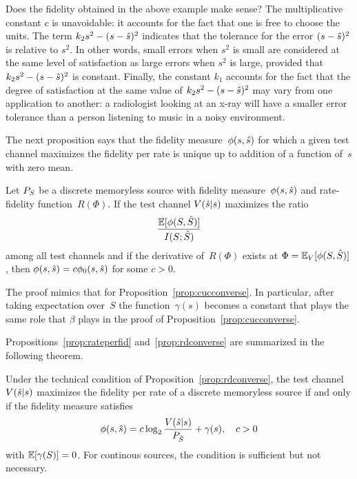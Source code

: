 Does the fidelity obtained in the above example make sense? The multiplicative
constant $c$ is unavoidable: it accounts for the fact that one is free to choose
the units. The term $k_2s^2-(s-{\hat{s}})^2$ indicates that the tolerance for the
error $(s-{\hat{s}})^2$ is relative to $s^2$. In other words, small errors when $s^2$
is small are considered at the same level of satisfaction as large errors when
$s^2$ is large, provided that $k_2s^2-(s-{\hat{s}})^2$ is constant. Finally, the
constant $k_1$ accounts for the fact that the degree of satisfaction at the same
value of $k_2s^2-(s-{\hat{s}})^2$ may vary from one application to another: a
radiologist looking at an x-ray will have a smaller error tolerance than a
person listening to music in a noisy environment.

The next proposition says that the fidelity measure~$\phi(s,{\hat{s}})$ for which a
given test channel maximizes the fidelity per rate is unique up to addition of a
function of~$s$ with zero mean.

\begin{proposition}
  \label{prop:rdconverse}
  Let ${P_S}$ be a discrete memoryless source with fidelity measure~$\phi(s,{\hat{s}})$
  and rate-fidelity function~$R(\Phi)$. If the test channel $V({\hat{s}}|s)$ maximizes
  the ratio
  \[ \frac{\mathbb{E}[\phi(S,{\hat{S}})]}{I(S;{\hat{S}})} \]
  among all test channels and if the derivative of~$R(\Phi)$ exists at $\Phi =
  {\mathbb{E}_V}[\phi(S,{\hat{S}})]$, then $\phi(s,{\hat{s}}) = c {\phi_0}(s,{\hat{s}})$ for some $c > 0$.
\end{proposition}

The proof mimics that for Proposition~\ref{prop:cucconverse}. In particular,
after taking expectation over~$S$ the function~$\gamma(s)$ becomes a constant
that plays the same role that $\beta$ plays in the proof of
Proposition~\ref{prop:cucconverse}.

Propositions~\ref{prop:rateperfid} and~\ref{prop:rdconverse} are summarized in
the following theorem.
\begin{theorem}
  \label{thm:rdthm}
  Under the technical condition of Proposition~\ref{prop:rdconverse}, the
  test channel~$V({\hat{s}}|s)$ maximizes the fidelity per rate of a
  discrete memoryless source if and only if the fidelity measure satisfies
  \begin{equation}
    \label{eq:optfid}
    \phi(s,{\hat{s}}) = c \log_2\frac{V({\hat{s}}|s)}{{P_{\hat{S}}}} + \gamma(s), \quad c > 0
  \end{equation}
  with $\mathbb{E}[\gamma(S)] = 0$.  For continous sources, the condition is sufficient
  but not necessary.
\end{theorem}

